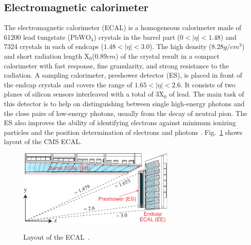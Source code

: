 \subsection*{Electromagnetic calorimeter}
The electromagnetic calorimeter (ECAL) is a homogeneous calorimeter made of 61200 lead tungstate ($\text{PbWO}_{4}$) crystals in the barrel part ($0<|\eta|<1.48$) and 7324 crystals in each of endcaps ($1.48<|\eta|<3.0$). 
The high density ($8.28\unit{g}/\unit{cm}^{3}$) and short radiation length $\text{X}_{0}$\footnotemark ($0.89\unit{cm}$) of the crystal result in a compact calorimeter with fast response, fine granularity, and strong resistance to the radiation. A sampling calorimeter, preshower detector (ES), is placed in front of the endcap crystals and covers the range of $1.65<|\eta|<2.6$.  It consists of two planes of silicon sensors interleaved with a total of 3$\text{X}_{0}$ of lead.
The main task of this detector is to help on distinguishing between single high-energy photons and the close pairs of low-energy photons, usually from the decay of neutral pion. The ES also improves the ability of identifying electrons against minimum ionizing particles and the position determination of electrons and photons . Fig.~\ref{fig:EcalLayout} shows layout of the CMS ECAL.
\begin{figure}[!ht]
  \begin{center}
  	\includegraphics[width=0.7\textwidth]{Fig/CMS_Detector/Figure_004-001}\\
    \caption{Layout of the ECAL~\cite{Benaglia:2014aqa}.}
    \label{fig:EcalLayout}
  \end{center}
\end{figure}

